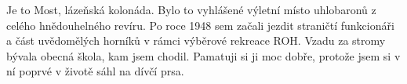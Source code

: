 
Je to Most, lázeňská kolonáda. Bylo to vyhlášené výletní místo
uhlobaronů z celého hnědouhelného revíru. Po roce 1948 sem začali
jezdit straničtí funkcionáři a část uvědomělých horníků v rámci
výběrové rekreace ROH. Vzadu za stromy bývala obecná škola, kam jsem
chodil. Pamatuji si ji moc dobře, protože jsem si v ní poprvé v životě
sáhl na dívčí prsa.
